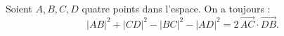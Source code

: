 Soient $A, B, C, D$ quatre points dans l'espace. On a toujours :
\[
|AB|^2 + |CD|^2 - |BC|^2 - |AD|^2 = 2\,\overrightarrow{AC} \cdot \overrightarrow{DB}.
\]
